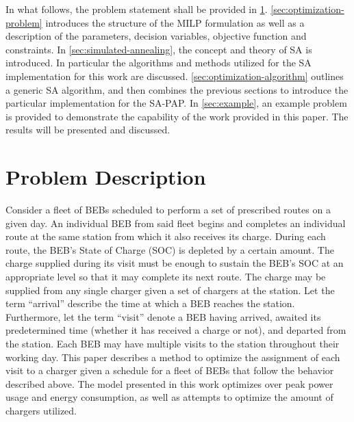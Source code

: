 \documentclass[ee,thesis]{usuthesis}
\begin{document}
In what follows, the problem statement shall be provided in \ref{sec:problem-description}. \ref{sec:optimization-problem}
introduces the structure of the MILP formulation as well as a description of the parameters, decision variables,
objective function and constraints. In \ref{sec:simulated-annealing}, the concept and theory of SA is introduced. In
particular the algorithms and methods utilized for the SA implementation for this work are discussed.
\ref{sec:optimization-algorithm} outlines a generic SA algorithm, and then combines the previous sections to introduce the
particular implementation for the SA-PAP. In \ref{sec:example}, an example problem is provided to demonstrate the capability
of the work provided in this paper. The results will be presented and discussed.

\section{Problem Description}
\label{sec:problem-description}
Consider a fleet of BEBs scheduled to perform a set of prescribed routes on a given day. An individual BEB from said
fleet begins and completes an individual route at the same station from which it also receives its charge. During each
route, the BEB's State of Charge (SOC) is depleted by a certain amount. The charge supplied during its visit must be
enough to sustain the BEB's SOC at an appropriate level so that it may complete its next route. The charge may be
supplied from any single charger given a set of chargers at the station. Let the term ``arrival'' describe the time at
which a BEB reaches the station. Furthermore, let the term ``visit'' denote a BEB having arrived, awaited its
predetermined time (whether it has received a charge or not), and departed from the station. Each BEB may have multiple
visits to the station throughout their working day. This paper describes a method to optimize the assignment of each
visit to a charger given a schedule for a fleet of BEBs that follow the behavior described above. The model presented in
this work optimizes over peak power usage and energy consumption, as well as attempts to optimize the amount of chargers
utilized.
\end{document}
